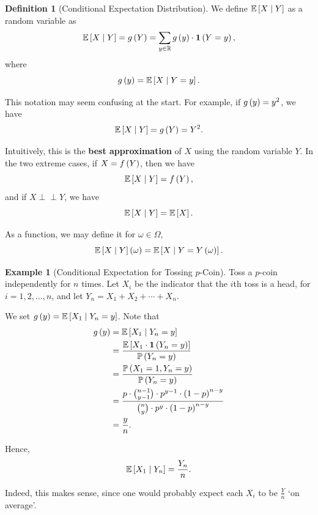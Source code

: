 \documentclass{article}
\theoremstyle{definition}
\newtheorem{definition}[theorem]{Definition}
\newtheorem{example}[theorem]{Example}
\theoremstyle{remark}
\newcommand{\RR}{\mathbb{R}}
\newcommand{\Prob}{\mathbb{P}}
\newcommand{\Expt}{\mathbb{E}}
\newcommand{\Conditional}[2]{#1\mid #2}
\newcommand{\indicator}{\mathbf{1}}
\newcommand{\indp}{\mathrel{\perp\!\!\!\perp}}
\begin{document}
\begin{definition}[Conditional Expectation Distribution]
    \label{def:conditional-expectation-distribution}%
    We define \(\Expt\bqty{\Conditional{X}{Y}}\) as a random variable as
    \[
        \Expt\bqty{\Conditional{X}{Y}} = g\pqty{Y} = \sum_{y \in \RR} g\pqty{y} \cdot \indicator\pqty{Y = y},
    \]
    where
    \[
        g\pqty{y} = \Expt\bqty{\Conditional{X}{Y = y}}.
    \]
\end{definition}

This notation may seem confusing at the start. For example, if \(g\left(y\right) = y^2\), we have
\[
    \Expt\bqty{\Conditional{X}{Y}} = g\pqty{Y} = Y^2.
\]

Intuitively, this is the \textbf{best approximation} of \(X\) using the random variable \(Y\). In the two extreme cases, if \(X = f\left(Y\right)\), then we have
\[
    \Expt\bqty{\Conditional{X}{Y}} = f\pqty{Y},
\]
and if \(X \indp Y\), we have
\[
    \Expt\bqty{\Conditional{X}{Y}} = \Expt\bqty{X}.
\]

As a function, we may define it for \(\omega \in \Omega\),
\[
    \Expt\bqty{\Conditional{X}{Y}}\pqty{\omega} = \Expt\bqty{\Conditional{X}{Y = Y\pqty{\omega}}}.
\]

\begin{example}[Conditional Expectation for Tossing \(p\)-Coin]
    \label{ex:conditional-expectatio-tossing-p-coin}%
    Toss a \(p\)-coin independently for \(n\) times. Let \(X_i\) be the indicator that the \(i\)th toss is a head, for \(i = 1, 2, \ldots, n\), and let \(Y_n = X_1 + X_2 + \cdots + X_n\).

    We set \(g\pqty{y} = \Expt\bqty{\Conditional{X_1}{Y_n = y}}\). Note that
    \begin{align*}
        g\pqty{y} &= \Expt\bqty{\Conditional{X_1}{Y_n = y}} \\
        &= \frac{\Expt\bqty{X_1 \cdot \indicator\pqty{Y_n = y}}}{\Prob\pqty{Y_n = y}} \\
        &= \frac{\Prob\pqty{X_1 = 1, Y_n = y}}{\Prob\pqty{Y_n = y}} \\
        &= \frac{p \cdot \binom{n - 1}{y - 1} \cdot p^{y - 1} \cdot \pqty{1 - p}^{n - y}}{\binom{n}{y} \cdot p^y \cdot \pqty{1 - p}^{n - y}} \\
        &= \frac{y}{n}.
    \end{align*}

    Hence,
    \[
        \Expt\bqty{\Conditional{X_1}{Y_n}} = \frac{Y_n}{n}.
    \]

    Indeed, this makes sense, since one would probably expect each \(X_i\) to be \(\frac{Y}{n}\) `on average'.
\end{example}
\end{document}
